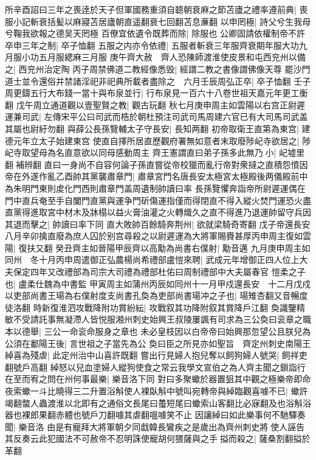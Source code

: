 所辛酉詔曰三年之喪逹於天子但軍國務重須自聼朝衰麻之節苫廬之禮率遵前典|{
	喪服小記斬衰括髪以麻寢苫居廬朝直遥翻衰七回翻苫息亷翻}
以申罔極|{
	詩父兮生我母兮鞠我欲報之德吴天罔極}
百僚宜依遺令既葬而除|{
	除服也}
公卿固請依權制帝不許卒申三年之制|{
	卒子恤翻}
五服之内亦令依禮|{
	五服者斬衰三年服齊衰期年服大功九月服小功五月服緦麻三月服}
庚午齊大赦　齊人恐陳師渡淮使皮景和屯西兖州以備之|{
	西兖州治定陶}
丙子周禁佛道二教經像悉毁|{
	經謂二教之書像謂佛像天尊}
罷沙門道士並令還俗并禁諸淫祀非祀典所載者盡除之　六月壬辰周弘正卒|{
	卒子恤翻}
壬子周更鑄五行大布錢一當十與布泉並行|{
	行布泉見一百六十八卷世祖天嘉元年更工衡翻}
戊午周立通道觀以壹聖賢之教|{
	觀古玩翻}
秋七月庚申周主如雲陽以右宫正尉遲運兼司武|{
	左傳宋平公曰司武而梏於朝杜預注司武司馬周建六官已有大司馬司武盖其屬也尉紆勿翻}
與薛公長孫覽輔太子守長安|{
	長知两翻}
初帝取衛王直第為東宫|{
	建德元年立太子始建東宫}
使直自擇所居直歷觀府署無如意者末取廢陟屺寺欲居之|{
	陟屺寺取望母為名直意欲以同母感動周主}
齊王憲謂直曰弟子孫多此無乃小|{
	屺墟里翻補辨翻}
直曰一身尚不自容何論子孫直嘗從帝校獵而亂行帝對衆撻之直積怨憤因帝在外遂作亂乙酉帥其黨襲肅章門|{
	肅章宮門名唐長安太極宮太極殿後两儀殿前中為朱明門東則䖍化門西則肅章門盖周遺制帥讀曰率}
長孫覽懼奔詣帝所尉遲運偶在門中直兵奄至手自闔門直黨與運争門斫傷運指僅而得閉直不得入縱火焚門運恐火盡直黨得進取宮中材木及牀榻以益火膏油灌之火轉熾久之直不得進乃退運帥留守兵因其退而擊之|{
	帥讀曰率下同}
直大敗帥百餘騎奔荆州|{
	欲就梁騎奇寄翻}
戊子帝還長安八月辛卯擒直廢為庶人囚於别宫尋殺之以尉遲運為大將軍賜賚甚厚丙申周主復如雲陽|{
	復扶又翻}
癸丑齊主如晉陽甲辰齊以高勱為尚書右僕射|{
	勱音邁}
九月庚申周主如同州　冬十月丙申周遣御正弘農楊尚希禮部盧愷來聘|{
	武成元年增御正四人位上大夫保定四年又改禮部為司宗大司禮為禮部杜佑曰周制禮部中大夫屬春官}
愷柔之子也|{
	盧柔仕魏為中書監}
甲寅周主如蒲州丙辰如同州十一月甲戍還長安　十二月戊戍以吏部尚書王瑒為右僕射度支尚書孔奐為吏部尚書瑒冲之子也|{
	瑒雉杏翻又音暢度徒洛翻}
時新復淮泗攻戰降附功賞紛紜|{
	攻戰叙其功降附叙其賞降戶江翻}
奐識鑒精敏不受請託事無凝滯人皆悦服湘州刺史始興王叔陵屢諷有司求為三公奐曰衮章之職本以德舉|{
	三公一命衮命服身之章也}
未必皇枝因以白帝帝曰始興那忽望公且朕兒為公須在鄱陽王後|{
	言世祖之子當先為公}
奐曰臣之所見亦如聖旨　齊定州刺史南陽王綽喜為殘虐|{
	此定州治中山喜許既翻}
嘗出行見婦人抱兒奪以飼狗婦人號哭|{
	飼祥吏翻號戶高翻}
綽怒以兒血塗婦人縱狗使食之常云我學文宣伯之為人齊主聞之鎻詣行在至而宥之問在州何事最樂|{
	樂音洛下同}
對曰多聚蠍於器置狙其中觀之極樂帝即命夜索蠍一斗比曉得三二升置浴斛使人裸臥斛中號叫宛轉帝與綽臨觀喜噱不已|{
	蠍許竭翻螫人蟲渡淮以北即有之通俗文長尾曰蠆短尾曰蠍索山客翻比必寐翻及也浴斛浴器也裸郎果翻赤體也號戶刀翻噱其虐翻嗢噱笑不止}
因讓綽曰如此樂事何不馳驛奏聞|{
	樂音洛}
由是有寵拜大將軍朝夕同戱韓長鸞疾之是歲出為齊州刺史將使人誣告其反奏云此犯國法不可赦帝不忍明誅使寵胡何猥薩與之手搤而殺之|{
	薩桑割翻搤於革翻}



